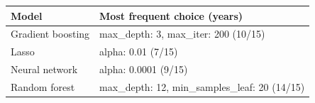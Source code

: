 \begin{tabular}{ll}
\toprule
Model & Most frequent choice (years) \\
\midrule
Gradient boosting & max\_depth: 3, max\_iter: 200 (10/15) \\
Lasso & alpha: 0.01 (7/15) \\
Neural network & alpha: 0.0001 (9/15) \\
Random forest & max\_depth: 12, min\_samples\_leaf: 20 (14/15) \\
\bottomrule
\end{tabular}
